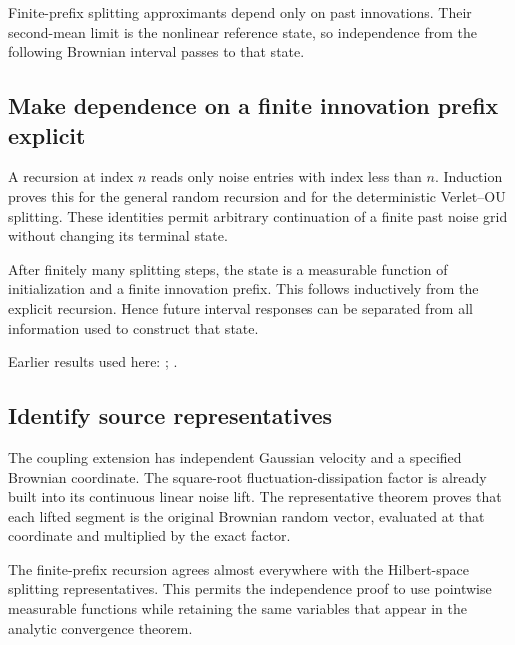 \documentclass[11pt,a4paper]{report}
\begin{document}
Finite-prefix splitting approximants depend only on past innovations. Their second-mean limit is the nonlinear reference state, so independence from the following Brownian interval passes to that state.

\subsection{\texorpdfstring{Make dependence on a finite innovation prefix explicit}{Make dependence on a finite innovation prefix explicit}}
\label{report-step-KineticLangevin-CanonicalPastFuture-lean-1}


A recursion at index \(n\) reads only noise entries with index less than \(n\). Induction proves this for the general random recursion and for the deterministic Verlet–OU splitting. These identities permit arbitrary continuation of a finite past noise grid without changing its terminal state.



After finitely many splitting steps, the state is a measurable function of initialization and a finite innovation prefix. This follows inductively from the explicit recursion. Hence future interval responses can be separated from all information used to construct that state.



Earlier results used here: \cite[Section~3.20.1]{LangevinLean2026ULASC}; \cite[Section~3.20.3]{LangevinLean2026ULASC}.
\subsection{\texorpdfstring{Identify source representatives}{Identify source representatives}}
\label{report-step-KineticLangevin-CanonicalPastFuture-lean-2}


The coupling extension has independent Gaussian velocity and a specified Brownian coordinate. The square-root fluctuation-dissipation factor is already built into its continuous linear noise lift. The representative theorem proves that each lifted segment is the original Brownian random vector, evaluated at that coordinate and multiplied by the exact factor.



The finite-prefix recursion agrees almost everywhere with the Hilbert-space splitting representatives. This permits the independence proof to use pointwise measurable functions while retaining the same variables that appear in the analytic convergence theorem.
\end{document}
